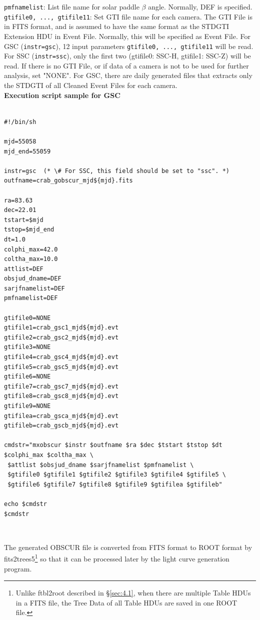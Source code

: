 \documentclass[10pt]{report}
\renewcommand{\_}{\textscale{.5}{\textbf{\textunderscore}}}
\begin{document}
\noindent \texttt{pmfnamelist}: List file name for solar paddle  $\beta$ angle. Normally, DEF is specified.\\

\noindent \texttt{gtifile0, .\!.\!., gtifile11}: Set GTI file name for each camera. The GTI File is in FITS format, and is assumed to have the same format as the STDGTI Extension HDU in Event File. Normally, this will be specified as Event File. For GSC (\texttt{instr=gsc}), 12 input parameters \texttt{gtifile0, ..., gtifile11} will be read. For SSC (\texttt{instr=ssc}), only the first two (gtifile0: SSC-H, gtifile1: SSC-Z) will be read. If there is no GTI File, or if data of a camera is not to be used for further analysis, set "NONE". For GSC, there are daily generated files that extracts only the STDGTI of all Cleaned Event Files for each camera. \\

\noindent \textbf{Execution script sample for GSC} \\

\begin{lstlisting}[frame=single]

#!/bin/sh

mjd=55058
mjd_end=55059

instr=gsc  (* \# For SSC, this field should be set to "ssc". *)
outfname=crab_gobscur_mjd${mjd}.fits

ra=83.63
dec=22.01
tstart=$mjd
tstop=$mjd_end
dt=1.0
colphi_max=42.0
coltha_max=10.0
attlist=DEF
obsjud_dname=DEF
sarjfnamelist=DEF
pmfnamelist=DEF

gtifile0=NONE
gtifile1=crab_gsc1_mjd${mjd}.evt
gtifile2=crab_gsc2_mjd${mjd}.evt
gtifile3=NONE
gtifile4=crab_gsc4_mjd${mjd}.evt
gtifile5=crab_gsc5_mjd${mjd}.evt
gtifile6=NONE
gtifile7=crab_gsc7_mjd${mjd}.evt
gtifile8=crab_gsc8_mjd${mjd}.evt
gtifile9=NONE
gtifilea=crab_gsca_mjd${mjd}.evt
gtifileb=crab_gscb_mjd${mjd}.evt

cmdstr="mxobscur $instr $outfname $ra $dec $tstart $tstop $dt $colphi_max $coltha_max \
 $attlist $obsjud_dname $sarjfnamelist $pmfnamelist \
 $gtifile0 $gtifile1 $gtifile2 $gtifile3 $gtifile4 $gtifile5 \
 $gtifile6 $gtifile7 $gtifile8 $gtifile9 $gtifilea $gtifileb"

echo $cmdstr
$cmdstr

\end{lstlisting}

\

The generated OBSCUR file is converted from FITS format to ROOT format by fits2trees5\footnote{Unlike ftbl2root described in \S\ref{sec:4.1}, when there are multiple Table HDUs in a FITS file, the Tree Data of all Table HDUs are saved in one ROOT file.} so that it can be processed later by the light curve generation program. \\
\end{document}
